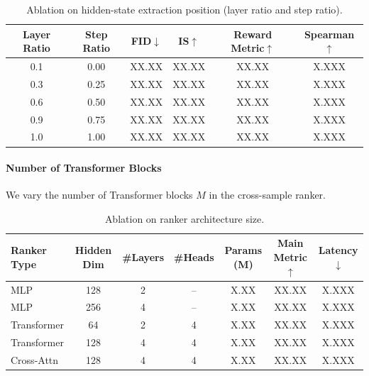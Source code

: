 \documentclass{article}
\begin{document}
\begin{table}[htbp]
\centering
\caption{Ablation on hidden-state extraction position (layer ratio and step ratio).}
\label{tab:ablation_layer_step}
\begin{tabular}{cccccc}
\toprule
Layer Ratio & Step Ratio & FID$\downarrow$ & IS$\uparrow$ & Reward Metric$\uparrow$ & Spearman$\uparrow$ \\
\midrule
0.1 & 0.00 & XX.XX & XX.XX & XX.XX & X.XXX \\
0.3 & 0.25 & XX.XX & XX.XX & XX.XX & X.XXX \\
0.6 & 0.50 & XX.XX & XX.XX & XX.XX & X.XXX \\
0.9 & 0.75 & XX.XX & XX.XX & XX.XX & X.XXX \\
1.0 & 1.00 & XX.XX & XX.XX & XX.XX & X.XXX \\
\bottomrule
\end{tabular}
\end{table}


\paragraph{Number of Transformer Blocks}
We vary the number of Transformer blocks $M$ in the cross-sample ranker. 

\begin{table}[htbp]
\centering
\caption{Ablation on ranker architecture size.}
\label{tab:ablation_arch}
\begin{tabular}{lcccccc}
\toprule
Ranker Type & Hidden Dim & \#Layers & \#Heads & Params (M) & Main Metric$\uparrow$ & Latency$\downarrow$ \\
\midrule
MLP & 128 & 2 & -- & X.XX & XX.XX & X.XXX \\
MLP & 256 & 4 & -- & X.XX & XX.XX & X.XXX \\
Transformer & 64 & 2 & 4 & X.XX & XX.XX & X.XXX \\
Transformer & 128 & 4 & 4 & X.XX & XX.XX & X.XXX \\
Cross-Attn & 128 & 4 & 4 & X.XX & XX.XX & X.XXX \\
\bottomrule
\end{tabular}
\end{table}
\end{document}
